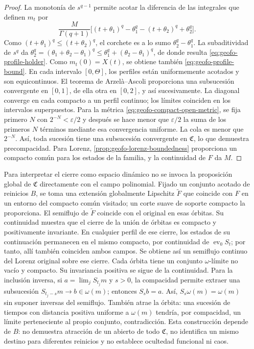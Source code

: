 \begin{proof}
La monotonía de \(s^{q-1}\) permite acotar la diferencia de las integrales
que definen \(m_t\) por
\[
 \frac{M}{\Gamma(q+1)}
 \bigl[(t+\theta_1)^q-\theta_1^q
       -(t+\theta_2)^q+\theta_2^q\bigr].
\]
Como \((t+\theta_1)^q\le(t+\theta_2)^q\), el corchete es a lo sumo
\(\theta_2^q-\theta_1^q\). La subaditividad de \(s^q\) da
\(\theta_2^q=(\theta_1+\theta_2-\theta_1)^q
\le\theta_1^q+(\theta_2-\theta_1)^q\), de donde resulta
\cref{eq:geofo-profile-holder}.
Como \(m_t(0)=X(t)\), se obtiene también
\cref{eq:geofo-profile-bound}. En cada intervalo \([0,\Theta]\), los
perfiles están uniformemente acotados y son equicontinuos. El teorema de
Arzelà--Ascoli proporciona una subsucesión convergente en \([0,1]\), de
ella otra en \([0,2]\), y así sucesivamente. La diagonal converge en cada
compacto a un perfil continuo; los límites coinciden en los intervalos
superpuestos. Para la métrica \cref{eq:geofo-compact-open-metric}, se fija
primero \(N\) con \(2^{-N}<\varepsilon/2\) y después se hace menor que
\(\varepsilon/2\) la suma de los primeros \(N\) términos mediante esa
convergencia uniforme. La cola es menor que \(2^{-N}\). Así, toda sucesión
tiene una subsucesión convergente en \(\mathfrak C\), lo que demuestra
precompacidad.
Para Lorenz, \cref{prop:geofo-lorenz-boundedness} proporciona un compacto
común para los estados de la familia, y la continuidad de \(F\) da \(M\).
\end{proof}

Para interpretar el cierre como espacio dinámico no se invoca la proposición
global de \(\mathfrak C\) directamente con el campo polinomial. Fijado
un conjunto acotado de reinicios \(B\), se toma una extensión globalmente
Lipschitz \(\widetilde F\) que coincide con \(F\) en un entorno del
compacto común visitado; un corte suave de soporte compacto la proporciona.
El semiflujo de \(\widetilde F\) coincide con el original en esas órbitas.
Su continuidad muestra que el cierre de la unión de órbitas es compacto y
positivamente invariante. En cualquier perfil de ese cierre, los estados de
su continuación permanecen en el mismo compacto, por continuidad de
\(\operatorname{ev}_0S_t\); por tanto, allí también coinciden ambos campos.
Se obtiene así un semiflujo continuo del Lorenz original sobre ese cierre.
Cada órbita tiene un conjunto \(\omega\)-límite no vacío y compacto.
Su invariancia positiva se sigue de la continuidad. Para la inclusión
inversa, si \(a=\lim_jS_{t_j}m\) y \(s>0\), la compacidad permite
extraer una subsucesión \(S_{t_j-s}m\to b\in\omega(m)\); entonces
\(S_sb=a\). Así, \(S_s\omega(m)=\omega(m)\) sin suponer inversas
del semiflujo. También atrae la órbita: una sucesión de tiempos con distancia
positiva uniforme a \(\omega(m)\) tendría, por compacidad, un límite
perteneciente al propio conjunto, contradicción.
Esta construcción depende de \(B\):
no demuestra atracción de un abierto de todo \(\mathfrak C\), no
identifica un mismo destino para diferentes reinicios y no establece
ocultedad funcional ni caos.

